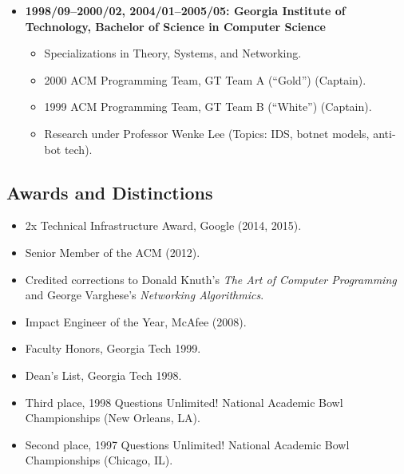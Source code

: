 \documentclass{article}
\newenvironment{tightitemize}
{\begin{itemize}
  \setlength{\itemsep}{1pt}
  \setlength{\parskip}{0pt}
  \setlength{\parsep}{0pt}}
{\end{itemize}}
\begin{document}
\begin{tightitemize}
\item \textbf{1998/09--2000/02, 2004/01--2005/05: Georgia Institute of Technology,
Bachelor of Science in Computer Science}
\begin{tightitemize}
\item Specializations in Theory, Systems, and Networking.
\item 2000 ACM Programming Team, GT Team A (``Gold'') (Captain).
\item 1999 ACM Programming Team, GT Team B (``White'') (Captain).
\item Research under Professor Wenke Lee (Topics: IDS, botnet models, anti-bot tech).
\end{tightitemize}
\end{tightitemize}

\vspace{2mm}
\subsection*{Awards and Distinctions}
\begin{tightitemize}
\item 2x Technical Infrastructure Award, Google (2014, 2015).
\item Senior Member of the ACM (2012).
\item Credited corrections to Donald Knuth's \textit{The Art of Computer Programming}
   and George Varghese's \textit{Networking Algorithmics}.
\item Impact Engineer of the Year, McAfee (2008).
\item Faculty Honors, Georgia Tech 1999.
\item Dean's List, Georgia Tech 1998.
\item Third place, 1998 Questions Unlimited! National Academic Bowl Championships (New Orleans, LA).
\item Second place, 1997 Questions Unlimited! National Academic Bowl Championships (Chicago, IL).
\end{tightitemize}

\vspace{2mm}
\end{document}
